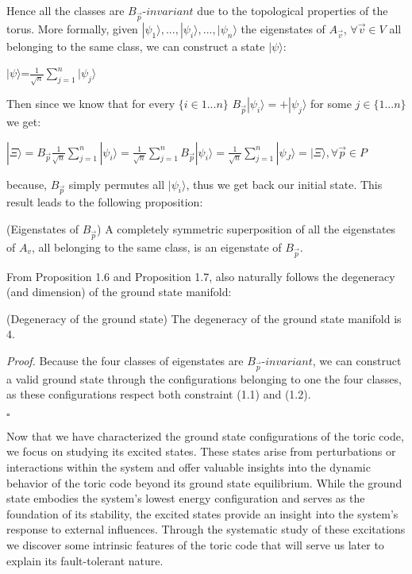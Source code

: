\documentclass{Configuration_Files/PoliMi3i_thesis}
\begin{document}
Hence all the classes are $B_{\vec{p}} $-$invariant$ due to the topological properties of the torus. More formally, given $|\psi_1\rangle,...,|\psi_i\rangle,...,|\psi_n\rangle$ the eigenstates of $A_{\vec{v}}$, $\forall \vec{v} \in V$ all belonging to the same class, we can construct a state $|\psi\rangle$:

\begin{center}
	$|\psi\rangle$=$\frac{1}{\sqrt{n}}\sum_{j=1}^{n} |\psi_j\rangle$
\end{center} 

Then since we know that for every $\{ i \in 1 ... n \}$ $B_{\vec{p}} |\psi_i\rangle=+|\psi_j\rangle$ for some $j \in \{ 1 ... n\}$ we get:

\begin{center}
	$|\Xi\rangle= B_{\vec{p}}  \frac{1}{\sqrt{n}} \sum_{j=1}^{n} |\psi_i\rangle = \frac{1}{\sqrt{n}} \sum_{j=1}^{n} B_{\vec{p}} |\psi_i\rangle = \frac{1}{\sqrt{n}} \sum_{j=1}^{n} |\psi_J\rangle =|\Xi\rangle , \forall \vec{p} \in P$
\end{center}

because, $B_{\vec{p}} $ simply permutes all $|\psi_i\rangle$, thus we get back our initial state. This result leads to the following proposition:

\begin{proposition}(Eigenstates of $B_{\vec{p}} $) A completely symmetric superposition of all the eigenstates of $A_v$, all belonging to the same class, is an eigenstate of $B_{\vec{p}} $.
\end{proposition}

From Proposition 1.6 and Proposition 1.7, also naturally follows the degeneracy (and dimension) of the ground state manifold: \newline

\begin{proposition} (Degeneracy of the ground state) The degeneracy of the ground state manifold is $4$. 
\end{proposition}

\textit{Proof.}\newline
Because the four classes of eigenstates are $B_{\vec{p}} $-$invariant$, we can construct a valid ground state through the configurations belonging to one the four classes, as these configurations respect both constraint (1.1) and (1.2). 

\hfill $\square$
 
Now that we have characterized the ground state configurations of the toric code, we focus on studying its excited states. These states arise from perturbations or interactions within the system and offer valuable insights into the dynamic behavior of the toric code beyond its ground state equilibrium. While the ground state embodies the system's lowest energy configuration and serves as the foundation of its stability, the excited states provide an insight into the system's response to external influences. 
Through the systematic study of these excitations we discover some intrinsic features of the toric code that will serve us later to explain its fault-tolerant nature.
\end{document}
